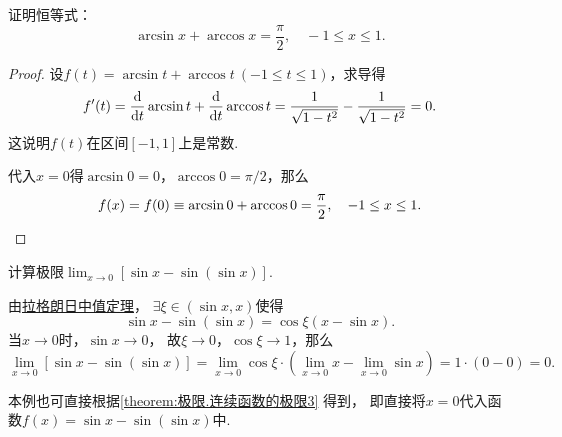 \begin{example}
证明恒等式：\[
	\arcsin x + \arccos x = \frac{\pi}{2},
	\quad -1 \leq x \leq 1.
\]
\begin{proof}
设\(f(t) = \arcsin t + \arccos t\ (-1 \leq t \leq 1)\)，求导得\[
	f'(t) = \dv{t} \arcsin t + \dv{t} \arccos t
	= \frac{1}{\sqrt{1-t^2}} - \frac{1}{\sqrt{1-t^2}} = 0.
\]
这说明\(f(t)\)在区间\([-1,1]\)上是常数.

代入\(x=0\)得\(\arcsin 0 = 0\)，\(\arccos 0 = \pi/2\)，那么\[
	f(x) = f(0) \equiv \arcsin 0 + \arccos 0 = \frac{\pi}{2},
	\quad -1 \leq x \leq 1.
	\qedhere
\]
\end{proof}
\end{example}

\begin{example}
\def\l{\lim_{x\to0}}%
计算极限\(\l \left[\sin x - \sin(\sin x)\right]\).
\begin{solution}
由\hyperref[theorem:微分中值定理.拉格朗日中值定理]{拉格朗日中值定理}，
\(\exists\xi\in(\sin x,x)\)使得\[
	\sin x - \sin(\sin x)
	= \cos\xi (x-\sin x).
\]
当\(x\to0\)时，\(\sin x\to0\)，
故\(\xi\to0\)，\(\cos\xi\to1\)，那么\[
	\l \left[\sin x - \sin(\sin x)\right]
	= \l \cos\xi \cdot \left(\l x - \l \sin x\right)
	= 1 \cdot (0-0) = 0.
\]
\end{solution}
\end{example}
本例也可直接根据\cref{theorem:极限.连续函数的极限3} 得到，
即直接将\(x=0\)代入函数\(f(x) = \sin x - \sin(\sin x)\)中.


